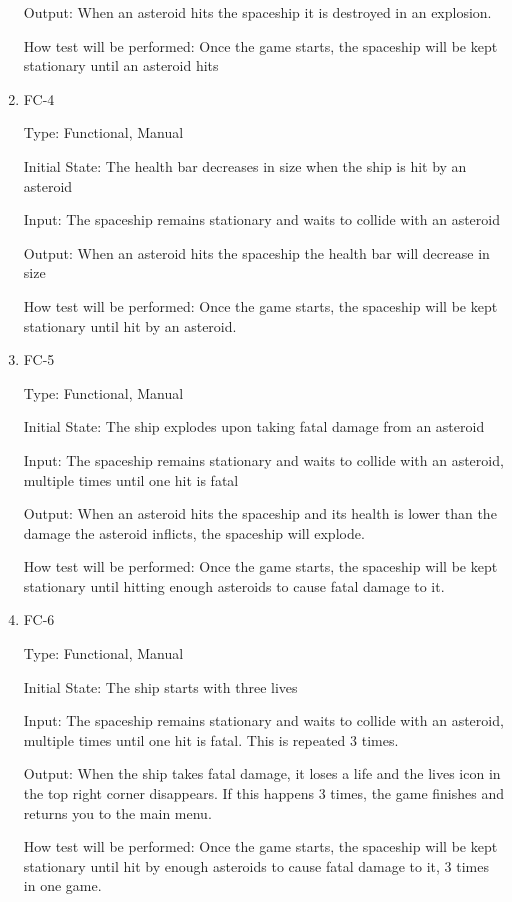 \documentclass[12pt, titlepage]{article}
\begin{document}
\begin{enumerate}
Output: When an asteroid hits the spaceship it is destroyed in an explosion.

How test will be performed: Once the game starts, the spaceship will be kept stationary until an asteroid hits

\item{FC-4}

Type: Functional, Manual

Initial State: The health bar decreases in size when the ship is hit by an asteroid

Input: The spaceship remains stationary and waits to collide with an asteroid

Output: When an asteroid hits the spaceship the health bar will decrease in size

How test will be performed: Once the game starts, the spaceship will be kept stationary until hit by an asteroid.

\item{FC-5}

Type: Functional, Manual

Initial State: The ship explodes upon taking fatal damage from an asteroid

Input: The spaceship remains stationary and waits to collide with an asteroid, multiple times until one hit is fatal

Output: When an asteroid hits the spaceship and its health is lower than the damage the asteroid inflicts, the spaceship will explode.

How test will be performed: Once the game starts, the spaceship will be kept stationary until hitting enough asteroids to cause fatal damage to it.

\item{FC-6}

Type: Functional, Manual

Initial State: The ship starts with three lives

Input: The spaceship remains stationary and waits to collide with an asteroid, multiple times until one hit is fatal. This is repeated 3 times.

Output: When the ship takes fatal damage, it loses a life and the lives icon in the top right corner disappears. If this happens 3 times, the game finishes and returns you to the main menu.

How test will be performed: Once the game starts, the spaceship will be kept stationary until hit by enough asteroids to cause fatal damage to it, 3 times in one game. 


\end{enumerate}
    
\end{document}
